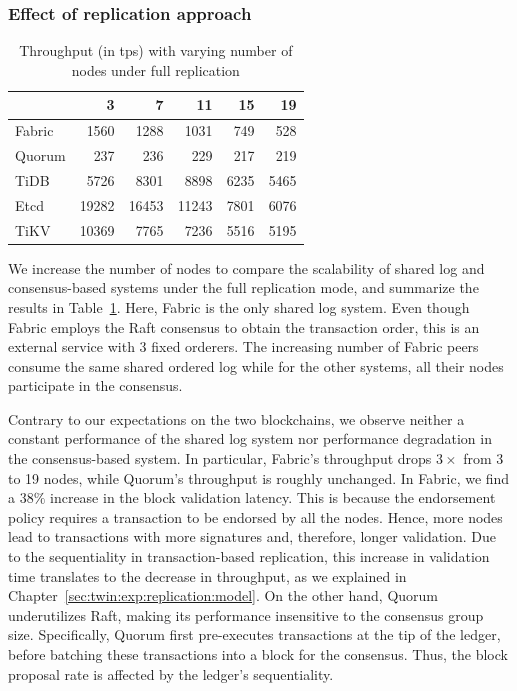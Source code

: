\subsubsection{Effect of replication approach}
\label{sec:twin:exp:replication:approach}

\begin{table}[tp]
    \centering
    \caption{Throughput (in tps) with varying number of nodes under full replication}
    \begin{tabular}{@{}lrrrrr@{}}
    \toprule
    \textbf{} & \textbf{3} & \textbf{7} & \textbf{11} & \textbf{15} & \textbf{19} \\ \midrule
    Fabric             & 1560        & 1288        & 1031         & 749         & 528         \\
    Quorum             & 237        & 236        & 229         & 217         & 219         \\
    TiDB               & 5726       & 8301       & 8898        & 6235        & 5465        \\
	Etcd               & 19282      & 16453      & 11243        & 7801        & 6076        \\ 
	TiKV               & 10369       & 7765       & 7236        & 5516        & 5195        \\
	\bottomrule
    \end{tabular}
    \label{tab:twin:scale}
\end{table}

We increase the number of nodes to compare the scalability of shared log and
consensus-based systems under the full replication mode, and summarize the
results in Table~\ref{tab:twin:scale}.
Here, Fabric is the only shared log system.
Even though Fabric employs the Raft consensus to obtain the transaction order,
this is an external service with 3 fixed orderers. 
The increasing number of Fabric peers consume the same shared ordered log while for the other systems, all their nodes participate in the consensus.

Contrary to our expectations on the two blockchains, we observe neither a constant performance of the
shared log system nor performance degradation in the consensus-based system.
In particular, Fabric's throughput drops $3\times$ from 3 to 19 nodes, while
Quorum's throughput is roughly unchanged.
In Fabric, we find a $38\%$ increase in the block validation latency.
This is because the endorsement policy requires a transaction to be endorsed by
all the nodes.
Hence, more nodes lead to transactions with more signatures and, therefore,
longer validation.
Due to the sequentiality in transaction-based replication, this increase in
validation time translates to the decrease in throughput, as we explained in
Chapter~\ref{sec:twin:exp:replication:model}.
On the other hand, Quorum underutilizes Raft, making its performance insensitive
to the consensus group size.
Specifically, Quorum first pre-executes transactions at the tip of the ledger,
before batching these transactions into a block for the consensus.
Thus, the block proposal rate is affected by the ledger's sequentiality.

